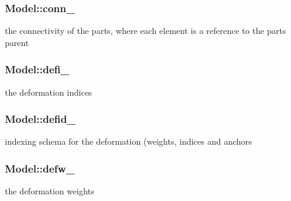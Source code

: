 \subsubsection[{conn\+\_\+}]{ Model\+::conn\+\_\+\hspace{0.3cm}{\ttfamily [protected]}}\label{classModel_a976b10b7048b41203eae19c141654abf}


the connectivity of the parts, where each element is a reference to the part\textquotesingle{}s parent 

\hypertarget{classModel_a477df0e7641f38782085d0a425625d12}{}
\subsubsection[{defi\+\_\+}]{ Model\+::defi\+\_\+\hspace{0.3cm}{\ttfamily [protected]}}\label{classModel_a477df0e7641f38782085d0a425625d12}


the deformation indices 

\hypertarget{classModel_a381f13c9035313ffd1cb67e07a2e84bd}{}
\subsubsection[{defid\+\_\+}]{ Model\+::defid\+\_\+\hspace{0.3cm}{\ttfamily [protected]}}\label{classModel_a381f13c9035313ffd1cb67e07a2e84bd}


indexing schema for the deformation (weights, indices and anchors 

\hypertarget{classModel_a1e1fba557437a9f4c0ef1535a64d83f2}{}
\subsubsection[{defw\+\_\+}]{ Model\+::defw\+\_\+\hspace{0.3cm}{\ttfamily [protected]}}\label{classModel_a1e1fba557437a9f4c0ef1535a64d83f2}


the deformation weights 

\hypertarget{classModel_a08e65111230ab010535cc9485dfd6d0d}{}
